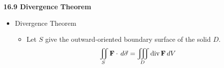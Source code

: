 \hr

\centerline{\bf 16.9 Divergence Theorem}
  \begin{itemize}
  \item Divergence Theorem
    \begin{itemize}
    \item Let $S$ give the outward-oriented boundary surface of the solid $D$.
    \[
      \iint_S \mathbf{F}\cdot\,d{\vec\sigma} = \iiint_D \textrm{div}\,{\mathbf{F}}\,d{V}
    \]
    \end{itemize}
  \end{itemize}
  
  
  
  
  
  
  
  
